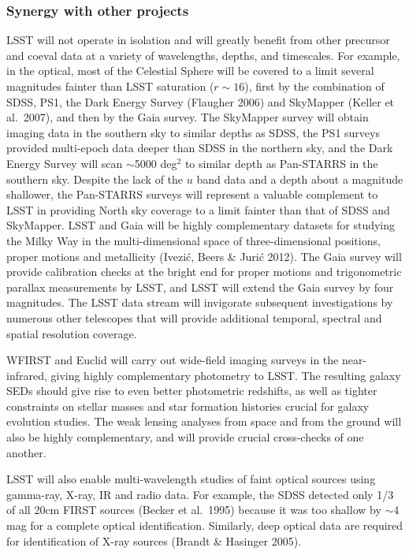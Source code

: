\documentclass{emulateapj}
\begin{document}
\subsubsection{  Synergy with other projects }

LSST will not operate in isolation and will greatly benefit from other precursor and coeval 
data at a variety of wavelengths, depths, and timescales. For example,
in the optical, most of the Celestial 
Sphere will be covered to a limit several magnitudes fainter than LSST saturation 
($r\sim16$), first by the combination of SDSS, PS1, the Dark Energy Survey (Flaugher 2006) and SkyMapper (Keller et al.~2007), 
and then by the Gaia survey. The SkyMapper survey will obtain imaging data in the southern
sky to similar depths as SDSS, the PS1 surveys provided multi-epoch data deeper 
than SDSS in the northern sky, and the Dark Energy Survey will scan 
$\sim$5000 deg$^2$ to similar depth as Pan-STARRS in the southern sky. Despite the lack of 
the $u$ band data and a depth about a magnitude shallower, the Pan-STARRS surveys
will represent a valuable complement to LSST in providing North sky coverage to a limit 
fainter than that of SDSS and SkyMapper. LSST and Gaia will 
be highly complementary datasets for studying the Milky Way in the multi-dimensional space of 
three-dimensional positions, proper motions and metallicity (Ivezi\'{c}, Beers \& Juri\'{c} 2012). 
The Gaia survey will provide calibration checks at the bright end for proper 
motions and trigonometric parallax measurements by LSST, and LSST will extend the 
Gaia survey by four magnitudes. The LSST data stream will invigorate subsequent 
investigations by numerous other telescopes that will provide 
additional temporal, spectral and spatial resolution coverage. 

WFIRST and Euclid will carry out wide-field imaging surveys in the
near-infrared, giving highly complementary photometry to LSST.  The
resulting galaxy SEDs should give rise to even better photometric
redshifts, as well as tighter constraints on stellar masses and star
formation histories crucial for galaxy evolution studies.  The weak
lensing analyses from space and from the ground will also be highly
complementary, and will provide crucial cross-checks of one another.  

LSST will also enable multi-wavelength studies of faint optical
sources using gamma-ray, X-ray, IR and radio data.  For example, the
SDSS detected only 1/3 of all 20cm FIRST sources (Becker et al.~1995)
because it was too shallow by $\sim$4 mag for a complete optical
identification. Similarly, deep optical data are required for
identification of X-ray sources (Brandt \& Hasinger 2005).
\end{document}
